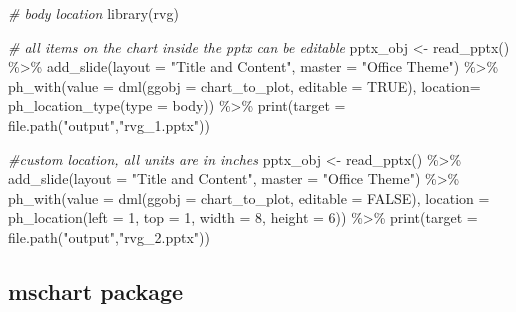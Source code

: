 \documentclass[
]{book}
\newenvironment{Shaded}{\begin{snugshade}}{\end{snugshade}}
\newcommand{\AttributeTok}[1]{\textcolor[rgb]{0.77,0.63,0.00}{#1}}
\newcommand{\CommentTok}[1]{\textcolor[rgb]{0.56,0.35,0.01}{\textit{#1}}}
\newcommand{\ConstantTok}[1]{\textcolor[rgb]{0.00,0.00,0.00}{#1}}
\newcommand{\DecValTok}[1]{\textcolor[rgb]{0.00,0.00,0.81}{#1}}
\newcommand{\FunctionTok}[1]{\textcolor[rgb]{0.00,0.00,0.00}{#1}}
\newcommand{\NormalTok}[1]{#1}
\newcommand{\OtherTok}[1]{\textcolor[rgb]{0.56,0.35,0.01}{#1}}
\newcommand{\SpecialCharTok}[1]{\textcolor[rgb]{0.00,0.00,0.00}{#1}}
\newcommand{\StringTok}[1]{\textcolor[rgb]{0.31,0.60,0.02}{#1}}
\begin{document}
\begin{Shaded}
\begin{Highlighting}[]
\CommentTok{\# body location}
\FunctionTok{library}\NormalTok{(rvg)}

\CommentTok{\# all items on the chart inside the pptx can be editable}
\NormalTok{pptx\_obj }\OtherTok{\textless{}{-}} \FunctionTok{read\_pptx}\NormalTok{() }\SpecialCharTok{\%\textgreater{}\%}
  \FunctionTok{add\_slide}\NormalTok{(}\AttributeTok{layout =} \StringTok{"Title and Content"}\NormalTok{, }\AttributeTok{master =} \StringTok{"Office Theme"}\NormalTok{) }\SpecialCharTok{\%\textgreater{}\%}
  \FunctionTok{ph\_with}\NormalTok{(}\AttributeTok{value =} \FunctionTok{dml}\NormalTok{(}\AttributeTok{ggobj =}\NormalTok{ chart\_to\_plot, }\AttributeTok{editable =} \ConstantTok{TRUE}\NormalTok{),}
          \AttributeTok{location=} \FunctionTok{ph\_location\_type}\NormalTok{(}\AttributeTok{type =} \StringTok{\textquotesingle{}body\textquotesingle{}}\NormalTok{)) }\SpecialCharTok{\%\textgreater{}\%} 
  \FunctionTok{print}\NormalTok{(}\AttributeTok{target =} \FunctionTok{file.path}\NormalTok{(}\StringTok{"output"}\NormalTok{,}\StringTok{"rvg\_1.pptx"}\NormalTok{))}

\CommentTok{\#custom location, all units are in inches}
\NormalTok{pptx\_obj }\OtherTok{\textless{}{-}} \FunctionTok{read\_pptx}\NormalTok{() }\SpecialCharTok{\%\textgreater{}\%}
  \FunctionTok{add\_slide}\NormalTok{(}\AttributeTok{layout =} \StringTok{"Title and Content"}\NormalTok{, }\AttributeTok{master =} \StringTok{"Office Theme"}\NormalTok{) }\SpecialCharTok{\%\textgreater{}\%}
  \FunctionTok{ph\_with}\NormalTok{(}\AttributeTok{value =} \FunctionTok{dml}\NormalTok{(}\AttributeTok{ggobj =}\NormalTok{ chart\_to\_plot, }\AttributeTok{editable =} \ConstantTok{FALSE}\NormalTok{),}
          \AttributeTok{location =}  \FunctionTok{ph\_location}\NormalTok{(}\AttributeTok{left =} \DecValTok{1}\NormalTok{, }\AttributeTok{top =} \DecValTok{1}\NormalTok{, }\AttributeTok{width =} \DecValTok{8}\NormalTok{, }\AttributeTok{height =} \DecValTok{6}\NormalTok{))  }\SpecialCharTok{\%\textgreater{}\%}
  \FunctionTok{print}\NormalTok{(}\AttributeTok{target =} \FunctionTok{file.path}\NormalTok{(}\StringTok{"output"}\NormalTok{,}\StringTok{"rvg\_2.pptx"}\NormalTok{))}
\end{Highlighting}
\end{Shaded}

\hypertarget{mschart-package}{%
\subsection{mschart package}\label{mschart-package}}
\end{document}
